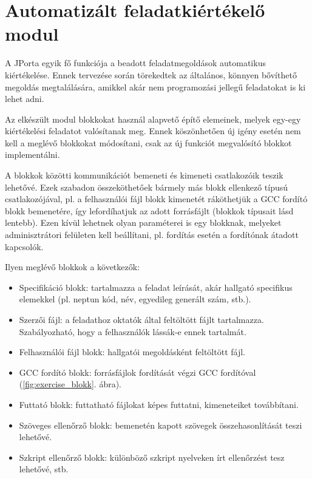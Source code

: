 \chapter{Automatizált feladatkiértékelő modul}\label{chapter:exercise}

A JPorta egyik fő funkciója a beadott feladatmegoldások automatikus kiértékelése. Ennek tervezése során törekedtek az általános, könnyen bővíthető megoldás megtalálására, amikkel akár nem programozási jellegű feladatokat is ki lehet adni. \cite{DudiMsc}

Az elkészült modul blokkokat használ alapvető építő elemeinek, melyek egy-egy kiértékelési feladatot valósítanak meg. Ennek köszönhetően új igény esetén nem kell a meglévő blokkokat módosítani, csak az új funkciót megvalósító blokkot implementálni.

A blokkok közötti kommunikációt bemeneti és kimeneti csatlakozóik teszik lehetővé. Ezek szabadon összeköthetőek bármely más blokk ellenkező típusú csatlakozójával, pl. a felhasználói fájl blokk kimenetét ráköthetjük a GCC fordító blokk bemenetére, így lefordíhatjuk az adott forrásfájlt (blokkok típusait lásd lentebb). Ezen kívül lehetnek olyan paraméterei is egy blokknak, melyeket adminisztrátori felületen kell beállítani, pl. fordítás esetén a fordítónak átadott kapcsolók.

Ilyen meglévő blokkok a következők:

\begin{itemize}
    \item Specifikáció blokk: tartalmazza a feladat leírását, akár hallgató specifikus elemekkel (pl. neptun kód, név, egyedileg generált szám, stb.). 
    \item Szerzői fájl: a feladathoz oktatók által feltöltött fájlt tartalmazza. Szabályozható, hogy a felhasználók lássák-e ennek tartalmát. \label{authorfile}
    \item Felhasználói fájl blokk: hallgatói megoldásként feltöltött fájl.
    \item GCC fordító blokk: forrásfájlok fordítását végzi GCC fordítóval (\ref{fig:exercise_blokk}. ábra).
    \item Futtató blokk: futtatható fájlokat képes futtatni, kimeneteiket továbbítani.
    \item Szöveges ellenőrző blokk: bemenetén kapott szövegek összehasonlítását teszi lehetővé.
    \item Szkript ellenőrző blokk: különböző szkript nyelveken írt ellenőrzést tesz lehetővé, stb.
\end{itemize} 

